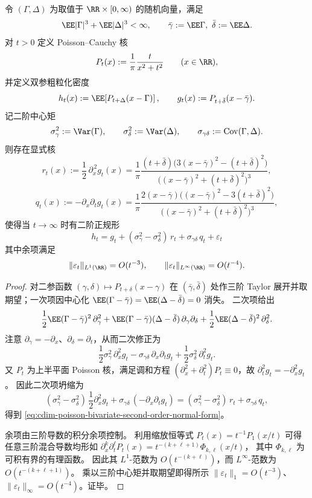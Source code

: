 \label{subsec:cdim-poisson-cauchy-bivariate-uplift}
\begin{proposition}\label{prop:cdim-poisson-bivariate-second-order-normal-form}
令 \((\Gamma,\Delta)\) 为取值于 \(\RR\times[0,\infty)\) 的随机向量，满足
\[
\EE|\Gamma|^3+\EE|\Delta|^3<\infty,
\qquad
\bar\gamma:=\EE\Gamma,\ \bar\delta:=\EE\Delta.
\]
对 \(t>0\) 定义 Poisson--Cauchy 核
\[
P_t(x):=\frac{1}{\pi}\frac{t}{x^2+t^2}\qquad(x\in\RR),
\]
并定义双参粗粒化密度
\[
h_t(x):=\EE\!\left[P_{t+\Delta}(x-\Gamma)\right],
\qquad
g_t(x):=P_{t+\bar\delta}(x-\bar\gamma).
\]
记二阶中心矩
\[
\sigma_\gamma^2:=\Var(\Gamma),\qquad
\sigma_\delta^2:=\Var(\Delta),\qquad
\sigma_{\gamma\delta}:=\mathrm{Cov}(\Gamma,\Delta).
\]
则存在显式核
\[
r_t(x):=\frac12\,\partial_x^{\,2} g_t(x)
=\frac{1}{\pi}\frac{(t+\bar\delta)\bigl(3(x-\bar\gamma)^2-(t+\bar\delta)^2\bigr)}{\bigl((x-\bar\gamma)^2+(t+\bar\delta)^2\bigr)^3},
\]
\[
q_t(x):=-\partial_x\partial_t g_t(x)
=\frac{1}{\pi}\frac{2(x-\bar\gamma)\bigl((x-\bar\gamma)^2-3(t+\bar\delta)^2\bigr)}{\bigl((x-\bar\gamma)^2+(t+\bar\delta)^2\bigr)^3},
\]
使得当 \(t\to\infty\) 时有二阶正规形
\begin{equation}\label{eq:cdim-poisson-bivariate-second-order-normal-form}
\boxed{\;
h_t
=
g_t
+(\sigma_\gamma^2-\sigma_\delta^2)\,r_t
+\sigma_{\gamma\delta}\,q_t
+\varepsilon_t\;}
\end{equation}
其中余项满足
\[
\|\varepsilon_t\|_{L^1(\RR)}=O(t^{-3}),
\qquad
\|\varepsilon_t\|_{L^\infty(\RR)}=O(t^{-4}).
\]
\end{proposition}
\begin{proof}
对二参函数 \((\gamma,\delta)\mapsto P_{t+\delta}(x-\gamma)\) 在 \((\bar\gamma,\bar\delta)\) 处作三阶 Taylor 展开并取期望；一次项因中心化 \(\EE(\Gamma-\bar\gamma)=\EE(\Delta-\bar\delta)=0\) 消失。
二次项给出
\[
\frac12\EE(\Gamma-\bar\gamma)^2\,\partial_\gamma^2
+\EE(\Gamma-\bar\gamma)(\Delta-\bar\delta)\,\partial_\gamma\partial_\delta
+\frac12\EE(\Delta-\bar\delta)^2\,\partial_\delta^2.
\]
注意 \(\partial_\gamma=-\partial_x\)、\(\partial_\delta=\partial_t\)，从而二次修正为
\[
\frac12\sigma_\gamma^2\,\partial_x^2 g_t
-\sigma_{\gamma\delta}\,\partial_x\partial_t g_t
+\frac12\sigma_\delta^2\,\partial_t^2 g_t.
\]
又 \(P_t\) 为上半平面 Poisson 核，满足调和方程 \((\partial_x^2+\partial_t^2)P_t\equiv 0\)，故 \(\partial_t^2 g_t=-\partial_x^2 g_t\)。
因此二次项坍缩为
\[
(\sigma_\gamma^2-\sigma_\delta^2)\,\frac12\partial_x^2 g_t
+\sigma_{\gamma\delta}\,(-\partial_x\partial_t g_t)
=(\sigma_\gamma^2-\sigma_\delta^2)\,r_t+\sigma_{\gamma\delta}\,q_t,
\]
得到 \eqref{eq:cdim-poisson-bivariate-second-order-normal-form}。
\par
余项由三阶导数的积分余项控制。
利用缩放恒等式 \(P_t(x)=t^{-1}P_1(x/t)\) 可得任意三阶混合导数均形如
\(
\partial_x^k\partial_t^\ell P_t(x)=t^{-(k+\ell+1)}\Phi_{k,\ell}(x/t)
\)，
其中 \(\Phi_{k,\ell}\) 为可积有界的有理函数。
因此其 \(L^1\)-范数为 \(O(t^{-(k+\ell)})\)，而 \(L^\infty\)-范数为 \(O(t^{-(k+\ell+1)})\)。
乘以三阶中心矩并取期望即得所示 \(\|\varepsilon_t\|_{1}=O(t^{-3})\)、\(\|\varepsilon_t\|_{\infty}=O(t^{-4})\)。证毕。
\end{proof}

